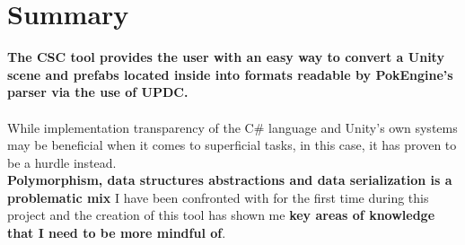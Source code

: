 \documentclass[12pt,a4paper]{article}
\begin{document}
\section{Summary}
\textbf{The CSC tool provides the user with an easy way to convert a Unity scene and prefabs located inside into formats readable by PokEngine's parser via the use of UPDC.}\\\\
While implementation transparency of the C\# language and Unity's own systems may be beneficial when it comes to superficial tasks, in this case, it has proven to be a hurdle instead.\\
\textbf{Polymorphism, data structures abstractions and data serialization is a problematic mix} I have been confronted with for the first time during this project and the creation of this tool has shown me \textbf{key areas of knowledge that I need to be more mindful of}.
\end{document}
